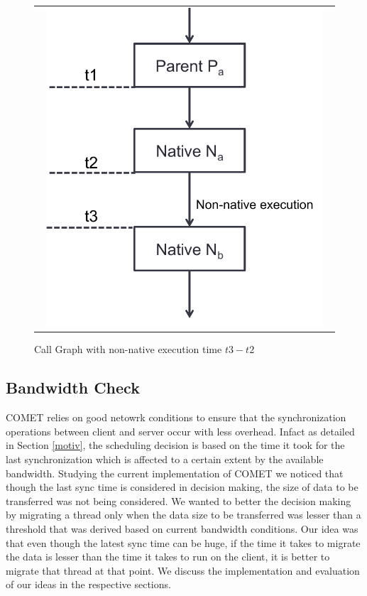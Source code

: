 \begin{figure} [thf*]
\centering
\begin{tabular}{c}
\begin{minipage}[b]{0.5\textwidth}
\includegraphics[width=0.95\textwidth]{figs/native_native.pdf}
\end{minipage}
\end{tabular}
\caption{Call Graph with non-native execution time $t3-t2$}
\label{fig:native_native}
\end{figure}

\subsection{Bandwidth Check}
COMET relies on good netowrk conditions to ensure that the synchronization operations between client and server occur with less overhead. Infact as detailed in Section \ref{motiv}, the scheduling decision is based on the time it took for the last synchronization which is affected to a certain extent by the available bandwidth. Studying the current implementation of COMET we noticed that though the last sync time is considered in decision making, the size of data to be transferred was not being considered. We wanted to better the decision making by migrating a thread only when the data size to be transferred was lesser than a threshold that was derived based on current bandwidth conditions. Our idea was that even though the latest sync time can be huge, if the time it takes to migrate the data is lesser than the time it takes to run on the client, it is better to migrate that thread at that point. We discuss the implementation and evaluation of our ideas in the respective sections.
